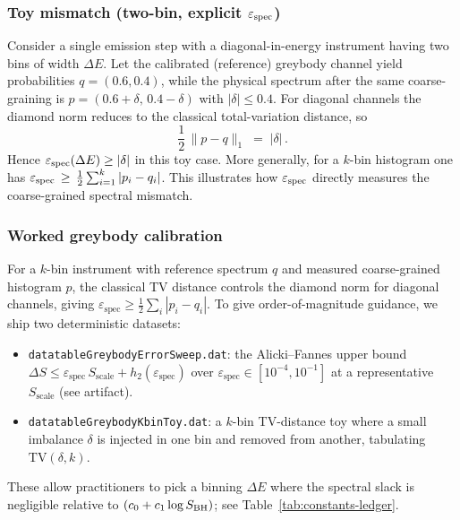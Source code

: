 \documentclass[aps,prd,preprint,onecolumn,superscriptaddress,nofootinbib,longbibliography,floatfix,11pt,showpacs,showkeys]{revtex4-2}
\theoremstyle{plain}
\theoremstyle{definition}
\theoremstyle{remark}
\begin{document}
\subsubsection{Toy mismatch (two-bin, explicit $\varepsilon_{\rm spec}$)}
Consider a single emission step with a diagonal-in-energy instrument having two bins of width $\Delta E$. Let the calibrated (reference) greybody channel yield probabilities $q=(0.6,0.4)$, while the physical spectrum after the same coarse-graining is $p=(0.6+\delta,\,0.4-\delta)$ with $|\delta|\le 0.4$. For diagonal channels the diamond norm reduces to the classical total-variation distance, so
\[
	\frac{1}{2}\,\|p-q\|_1\;=\;|\delta|\,.
\]
Hence $\varepsilon_{\rm spec}(\Delta E)\ge |\delta|$ in this toy case. More generally, for a $k$-bin histogram one has $\varepsilon_{\rm spec}\,\ge\,\tfrac12\sum_{i=1}^k |p_i-q_i|$. This illustrates how $\varepsilon_{\rm spec}$ directly measures the coarse-grained spectral mismatch.

\subsubsection{Worked greybody calibration}
For a $k$-bin instrument with reference spectrum $q$ and measured coarse-grained
histogram $p$, the classical TV distance controls the diamond norm for diagonal
channels, giving \(\varepsilon_{\mathrm{spec}} \ge \frac12\sum_i |p_i-q_i|\).
To give order-of-magnitude guidance, we ship two deterministic datasets:
\begin{itemize}
  \item \texttt{datatableGreybodyErrorSweep.dat}: the Alicki–Fannes upper bound
        \(\Delta S \le \varepsilon_{\mathrm{spec}}\,S_{\mathrm{scale}} + h_2(\varepsilon_{\mathrm{spec}})\)
        over \(\varepsilon_{\mathrm{spec}}\in[10^{-4},10^{-1}]\) at a representative
        \(S_{\mathrm{scale}}\) (see artifact).
  \item \texttt{datatableGreybodyKbinToy.dat}: a $k$-bin TV-distance toy where a small
        imbalance $\delta$ is injected in one bin and removed from another, tabulating
        \(\mathrm{TV}(\delta,k)\).
\end{itemize}
These allow practitioners to pick a binning \(\Delta E\) where the spectral slack is
negligible relative to $(c_0+c_1\log S_{\rm BH})$; see Table~\ref{tab:constants-ledger}.
\end{document}
